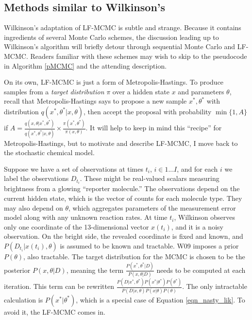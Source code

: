 \documentclass{article}
\begin{document}
\subsection{Methods similar to Wilkinson's}
\label{MC_backgr}
Wilkinson's adaptation of LF-MCMC is subtle and strange. Because it contains ingredients of several Monte Carlo schemes, the discussion leading up to Wilkinson's algorithm will briefly detour through sequential Monte Carlo and LF-MCMC. Readers familiar with these schemes may wish to skip to the pseudocode in Algorithm \ref{pMCMC} and the attending description. 

On its own, LF-MCMC is just a form of Metropolis-Hastings. To produce samples from a {\it target distribution} $\pi$ over a hidden state $x$ and parameters $\theta$, recall that Metropolis-Hastings says to propose a new sample $x^*, \theta^*$ with distribution $q(x^*, \theta^*|x, \theta)$, then accept the proposal with probability $\min \{1, A\}$ if $A=\frac{q(x, \theta|x^*, \theta^*)}{q(x^*, \theta^*|x, \theta)} \times \frac{\pi(x^*, \theta^*)}{\pi(x, \theta)}$. It will help to keep in mind this ``recipe'' for Metropolis-Hastings, but to motivate and describe LF-MCMC, I move back to the stochastic chemical model.

Suppose we have a set of observations at times $t_i$, $i \in 1...I$, and for each $i$ we label the observations $D_{t_i}$. These might be real-valued scalars measuring brightness from a glowing ``reporter molecule.'' The observations depend on the current hidden state, which is the vector of counts for each molecule type. They may also depend on $\theta$, which aggregates parameters of the measurement error model along with any unknown reaction rates. At time $t_i$, Wilkinson observes only one coordinate of the 13-dimensional vector $x(t_i)$, and it is a noisy observation. On the bright side, the revealed coordinate is fixed and known, and $P(D_{t_{i}}|x(t_i), \theta)$ is assumed to be known and tractable. W09 imposes a prior $P(\theta)$, also tractable. The target distribution for the MCMC is chosen to be the posterior $P(x, \theta|D)$, meaning the term $\frac{P(x^*, \theta^*|D)}{P(x, \theta|D)}$ needs to be computed at each iteration. This term can be rewritten $\frac{P(D|x^*, \theta^*)P(x^*|\theta^*)P(\theta^*)}{P(D|x, \theta)P(x| \theta)P(\theta)}$. The only intractable calculation is $P(x^*|\theta^*)$, which is a special case of Equation \ref{eqn_nasty_lik}. To avoid it, the LF-MCMC comes in.
\end{document}
